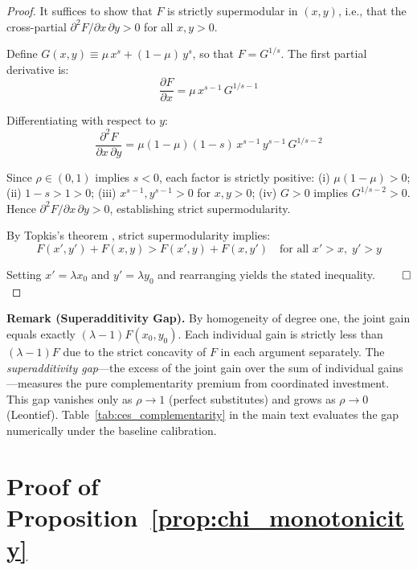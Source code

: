 \documentclass[12pt, a4paper]{article}
\begin{document}
\begin{proof}
It suffices to show that $F$ is strictly supermodular in $(x, y)$, i.e., that the cross-partial $\partial^2 F / \partial x \, \partial y > 0$ for all $x, y > 0$.

Define $G(x,y) \equiv \mu \, x^s + (1-\mu) \, y^s$, so that $F = G^{1/s}$. The first partial derivative is:
\begin{equation*}
\frac{\partial F}{\partial x} = \mu \, x^{s-1} \, G^{1/s - 1}
\end{equation*}

Differentiating with respect to $y$:
\begin{equation*}
\frac{\partial^2 F}{\partial x \, \partial y} = \mu(1-\mu)(1-s) \, x^{s-1} \, y^{s-1} \, G^{1/s - 2}
\end{equation*}

Since $\rho \in (0,1)$ implies $s < 0$, each factor is strictly positive: (i) $\mu(1-\mu) > 0$; (ii) $1-s > 1 > 0$; (iii) $x^{s-1}, y^{s-1} > 0$ for $x, y > 0$; (iv) $G > 0$ implies $G^{1/s-2} > 0$. Hence $\partial^2 F / \partial x \, \partial y > 0$, establishing strict supermodularity.

By Topkis's theorem \citep{topkis1998}, strict supermodularity implies:
\begin{equation*}
F(x', y') + F(x, y) > F(x', y) + F(x, y')
\quad \text{for all } x' > x,\; y' > y
\end{equation*}

Setting $x' = \lambda x_0$ and $y' = \lambda y_0$ and rearranging yields the stated inequality. $\qed$
\end{proof}

\noindent \textbf{Remark (Superadditivity Gap).} By homogeneity of degree one, the joint gain equals exactly $(\lambda - 1) F(x_0, y_0)$. Each individual gain is strictly less than $(\lambda-1) F$ due to the strict concavity of $F$ in each argument separately. The \textit{superadditivity gap}---the excess of the joint gain over the sum of individual gains---measures the pure complementarity premium from coordinated investment. This gap vanishes only as $\rho \to 1$ (perfect substitutes) and grows as $\rho \to 0$ (Leontief). Table~\ref{tab:ces_complementarity} in the main text evaluates the gap numerically under the baseline calibration.

\section{Proof of Proposition~\ref{prop:chi_monotonicity}} \label{app:proof_chi}
\end{document}
